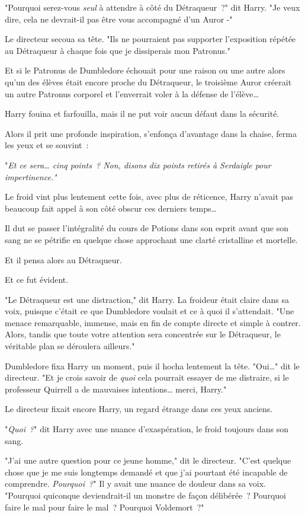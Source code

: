 "Pourquoi serez-vous \emph{seul} à attendre à côté du Détraqueur~?" dit Harry. "Je veux dire, cela ne devrait-il pas être vous accompagné d'un Auror -"

Le directeur secoua sa tête. "Ils ne pourraient pas supporter l'exposition répétée au Détraqueur à chaque fois que je dissiperais mon Patronus."

Et si le Patronus de Dumbledore échouait pour une raison ou une autre alors qu'un des élèves était encore proche du Détraqueur, le troisième Auror créerait un autre Patronus corporel et l'enverrait voler à la défense de l'élève…

Harry fouina et farfouilla, mais il ne put voir aucun défaut dans la sécurité.

Alors il prit une profonde inspiration, s'enfonça d'avantage dans la chaise, ferma les yeux et se souvint~:

"\emph{Et ce sera… cinq points~? Non, disons dix points retirés à Serdaigle pour impertinence."}

Le froid vint plus lentement cette fois, avec plus de réticence, Harry n'avait pas beaucoup fait appel à son côté obscur ces derniers temps…

Il dut se passer l'intégralité du cours de Potions dans son esprit avant que son sang ne se pétrifie en quelque chose approchant une clarté cristalline et mortelle.

Et il pensa alors au Détraqueur.

Et ce fut évident.

"Le Détraqueur est une distraction," dit Harry. La froideur était claire dans sa voix, puisque c'était ce que Dumbledore voulait et ce à quoi il s'attendait. "Une menace remarquable, immense, mais en fin de compte directe et simple à contrer. Alors, tandis que toute votre attention sera concentrée sur le Détraqueur, le véritable plan se déroulera ailleurs."

Dumbledore fixa Harry un moment, puis il hocha lentement la tête. "Oui…" dit le directeur. "Et je crois savoir de \emph{quoi} cela pourrait essayer de me distraire, si le professeur Quirrell a de mauvaises intentions… merci, Harry."

Le directeur fixait encore Harry, un regard étrange dans ces yeux anciens.

"\emph{Quoi~?}" dit Harry avec une nuance d'exaspération, le froid toujours dans son sang.

"J'ai une autre question pour ce jeune homme," dit le directeur. "C'est quelque chose que je me suis longtemps demandé et que j'ai pourtant été incapable de comprendre. \emph{Pourquoi~?}" Il y avait une nuance de douleur dans sa voix. "Pourquoi quiconque deviendrait-il un monstre de façon délibérée~? Pourquoi faire le mal pour faire le mal~? Pourquoi Voldemort~?"

